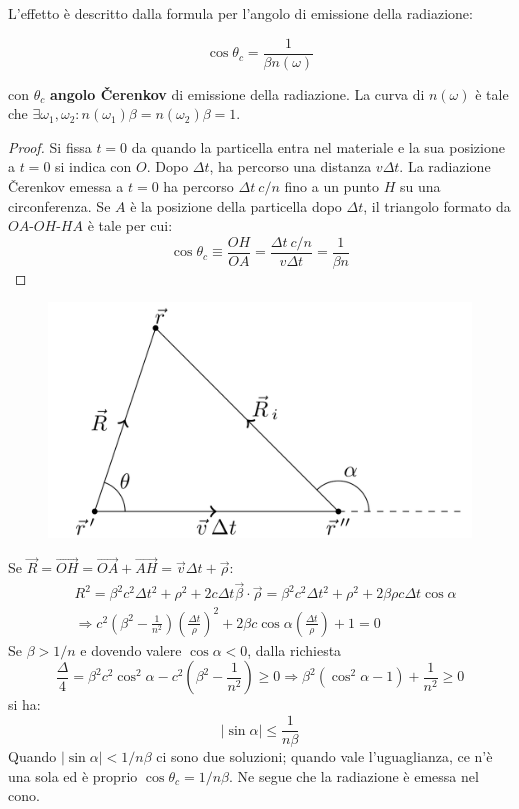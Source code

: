 \documentclass[10pt, a4paper]{scrartcl}
\numberwithin{equation}{subsection}
\theoremstyle{style1}
\newenvironment{boxenv}[1][]{
    \begin{eqbox}[#1]
    }{
   \end{eqbox}
}
\begin{document}
L'effetto \`e descritto dalla formula per l'angolo di emissione della radiazione:
\begin{boxenv}[]
\begin{equation}
	\cos \theta _c = \frac{1}{ \beta  n(\omega)}
\end{equation}
\end{boxenv}
\noindent con $\theta _c$ \textbf{angolo \v Cerenkov} di emissione della radiazione. La curva di $n(\omega)$ \`e tale che $\exists \omega_1, \omega_2 : n(\omega_1) \beta = n(\omega_2)\beta  = 1$.
\begin{proof}
	Si fissa $t=0$ da quando la particella entra nel materiale e la sua posizione a $t=0$ si indica con $O$. Dopo $\Delta t$, ha percorso una distanza $v\Delta t $. La radiazione \v Cerenkov emessa a $t=0$ ha percorso $\Delta t\ c / n$ fino a un punto $H$ su una circonferenza. Se $A$ \`e la posizione della particella dopo $\Delta  t$, il triangolo formato da $OA$-$OH$-$HA$ \`e tale per cui:
	\[
	\cos \theta  _c \equiv \frac{OH}{OA} = \frac{\Delta t\ c / n}{v \Delta  t} = \frac{1}{\beta  n}
	\] 
\end{proof}
\begin{figure}[h!]
	\centering
	\includegraphics[width=.4\columnwidth]{c2.png}
\end{figure}
\noindent Se $\vec{R} = \vec{OH} = \vec{OA}+\vec{AH}= \vec{v}\Delta  t + \vec{\rho }$:
\[
	\begin{split}
		&R^2 = \beta ^2 c^2 \Delta  t ^2 + \rho ^2 + 2c\Delta  t \vec{\beta }\cdot \vec{\rho }  = \beta ^2 c^2 \Delta t^2 + \rho ^2 + 2 \beta  \rho  c \Delta  t \cos \alpha \\
		&\Rightarrow c^2 \left(\beta ^2 - \frac{1}{n^2}\right) \left(\frac{\Delta  t}{\rho }\right) ^2 + 2 \beta  c \cos \alpha  \left(\frac{\Delta  t}{\rho }\right) +1 = 0
	\end{split}
\] 
Se $\beta  > 1 / n$ e dovendo valere $\cos \alpha  < 0$, dalla richiesta
\[
\frac{\Delta }{4} = \beta ^2 c^2 \cos^2 \alpha  - c^2 \left(\beta ^2 - \frac{1}{n^2}\right) \ge 0\Rightarrow \beta ^2 (\cos^2 \alpha  -1) + \frac{1}{n^2}\ge 0
\] 
si ha:
\begin{equation}
	\left\lvert \sin \alpha  \right\rvert \le \frac{1}{n \beta }
\end{equation}
Quando $\left\lvert \sin \alpha  \right\rvert < 1 / n\beta $ ci sono due soluzioni; quando vale l'uguaglianza, ce n'\`e una sola ed \`e proprio $\cos \theta _c = 1 / n\beta $. Ne segue che la radiazione \`e emessa nel cono.
\end{document}
